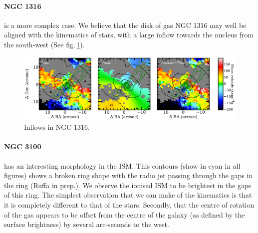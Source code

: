 		\paragraph{NGC 1316} is a more complex case. We believe that the disk of gas NGC 1316 may well be aligned with the kinematics of stars, with a large inflow towards the nucleus from the south-west (See fig.\,\ref{fig:Inflow}). 

		\begin{figure}
			\centering
			\includegraphics[width=\textwidth]{chapter5/ngc1316_inflow.png}
			\caption[Inflows in NGC 1316]{Inflows in NGC 1316.} 
			\label{fig:Inflow}
		\end{figure}


		\paragraph{NGC 3100} has an interesting morphology in the ISM. This  contours (show in cyan in all figures) shows a broken ring shape with the radio jet passing through the gaps in the ring (Ruffa in prep.). We observe the ionised ISM to be brightest in the gaps of this ring. The simplest observation that we can make of the kinematics is that it is completely different to that of the stars. Secondly, that the centre of rotation of the gas appears to be offset from the centre of the galaxy (as defined by the surface brightness) by several arc-seconds to the west. 








